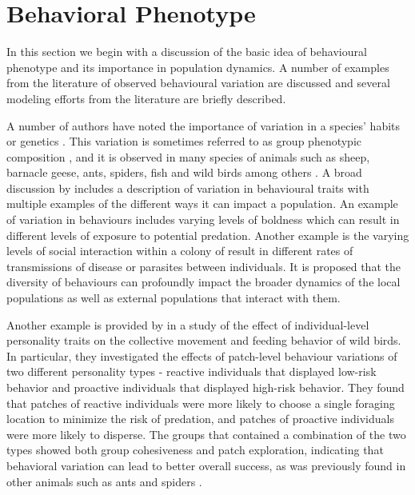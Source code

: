 \documentclass[review,authoryear]{elsarticle}
\begin{document}
\section{Behavioral Phenotype}
\label{section:behaviouralPhenotype}

In this section we begin with a discussion of the basic idea of behavioural phenotype and its importance in population dynamics. A number of examples from the literature of observed behavioural variation are discussed and several modeling efforts from the literature are briefly described.


A number of authors have noted the importance of variation
in a species' habits or
genetics \citep{doi:10.1111/j.1461-0248.2010.01536.x,doi:10.1086/687235,mierzejewski_horn_luong_2019,SANTICCHIA20191,doi:10.1098/rspb.2014.1016}. This variation is sometimes referred to as group phenotypic composition \citep{FARINE2015609}, and it is observed in many species of animals such as sheep, barnacle geese, ants, spiders, fish and wild birds among others \citep{sibbald2009individual,kurvers2011effect,modlmeier2012diverse,doi:10.1086/687235,doi:10.1098/rspb.2014.1016,doi:10.1037/0735-7036.107.3.250}.
A broad discussion by  \citep{doi:10.1111/j.1461-0248.2010.01536.x} includes a description of variation in behavioural traits with multiple examples of the different ways it can impact a population. An example of variation in behaviours includes varying levels of boldness which can result in different levels of exposure to potential predation. Another example is the varying levels of social interaction within a colony of result in different rates of transmissions of disease or parasites between individuals. It is proposed that the diversity of
behaviours can profoundly impact the broader dynamics of the local populations as well as external populations that interact with them.



Another example is provided by \cite{doi:10.1098/rspb.2014.1016} in a study of the effect of individual-level personality traits on the collective movement and feeding behavior of wild birds. In particular, they investigated the effects of patch-level behaviour variations of two different personality types - reactive individuals that displayed low-risk behavior and proactive individuals that displayed high-risk behavior. They found that patches of reactive individuals were more likely to choose a single foraging location to minimize the risk of predation, and patches of proactive individuals were more likely to disperse. The groups that contained a combination of the two types showed both group cohesiveness and patch exploration, indicating that behavioral variation can lead to better overall success, as was previously found in other animals such as ants and spiders \citep{ doi:10.1086/687235,modlmeier2011productivity,modlmeier2012diverse}.
\end{document}

